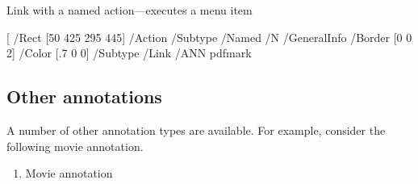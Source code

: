 \documentclass[letterpaper,12pt,english,openany,oneside]{sphinxmanual}
\begin{document}
\begin{sphinxVerbatim}[commandchars=\\\{\}]
\PYGZpc{} Link with a named action—executes a menu item

[ /Rect [50 425 295 445]
    /Action \PYGZlt{}\PYGZlt{} /Subtype /Named /N /GeneralInfo \PYGZgt{}\PYGZgt{}
    /Border [0 0 2]
    /Color [.7 0 0]
    /Subtype /Link
    /ANN pdfmark
\end{sphinxVerbatim}


\subsection{Other annotations}
\label{\detokenize{pdfmark_Basic:other-annotations}}
A number of other annotation types are available. For example, consider the following movie annotation.
\begin{enumerate}
%
\item {} 
Movie annotation

\end{enumerate}

\begin{sphinxVerbatim}[commandchars=\\\{\}]
\PYG{p}{[}  
        \PYG{p}{[}     \PYG{p}{]}
        
        

                 
              

            \PYG{p}{[}   \PYG{p}{]} 
           
        \PYG{p}{[}  \PYG{p}{]}
        \PYG{p}{[}  \PYG{p}{]}
        
\end{sphinxVerbatim}
\end{document}
